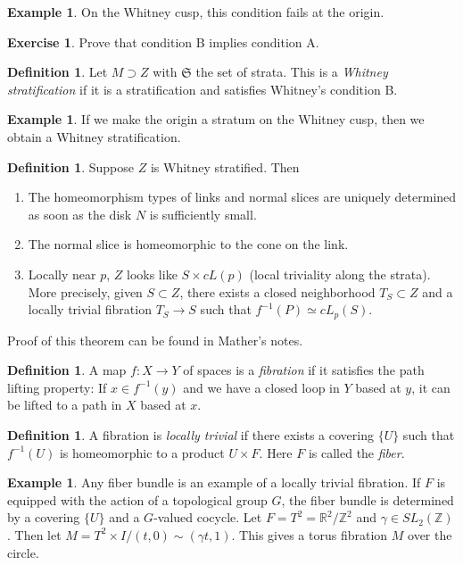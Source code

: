 \documentclass[leqno, openany]{memoir}
\theoremstyle{definition}
\newtheorem{defn}[thm]{Definition}
\newtheorem{exm}[thm]{Example}
\newtheorem{exer}[thm]{Exercise}
\theoremstyle{remark}
\theoremstyle{plain}
\theoremstyle{definition}
\theoremstyle{remark}
\newcommand{\R}{\mathbb{R}}
\newcommand{\Z}{\mathbb{Z}}
\newcommand{\mf}[1]{\mathfrak{#1}}
\begin{document}
\begin{exm} On the Whitney cusp, this condition fails at the origin.  \end{exm}

\begin{exer} Prove that condition B implies condition A.  \end{exer}

\begin{defn} Let $M \supset Z$ with $\mf{S}$ the set of strata. This is a
\textit{Whitney stratification} if it is a stratification and satisfies
Whitney's condition B.  \end{defn}

\begin{exm} If we make the origin a stratum on the Whitney cusp, then we obtain
a Whitney stratification.  \end{exm}

\begin{defn} Suppose $Z$ is Whitney stratified. Then \begin{enumerate} \item
    The homeomorphism types of links and normal slices are uniquely determined
    as soon as the disk $N$ is sufficiently small.  \item The normal slice is
    homeomorphic to the cone on the link.  \item Locally near $p$, $Z$ looks
    like $S \times cL(p)$ (local triviality along the strata). More precisely,
    given $S \subset Z$, there exists a closed neighborhood $T_S \subset Z$ and
    a locally trivial fibration $T_S \to S$ such that $f^{-1}(P) \simeq
    cL_p(S)$.  \end{enumerate} \end{defn} Proof of this theorem can be found in
    Mather's notes.

\begin{defn} A map $f: X \to Y$ of spaces is a \textit{fibration} if it
satisfies the path lifting property: If $x \in f^{-1}(y)$ and we have a closed
loop in $Y$ based at $y$, it can be lifted to a path in $X$ based at $x$.
\end{defn}

\begin{defn} A fibration is \textit{locally trivial} if there exists a covering
$\{U\}$ such that $f^{-1}(U)$ is homeomorphic to a product $U \times F$. Here
$F$ is called the \textit{fiber}.  \end{defn}

\begin{exm} Any fiber bundle is an example of a locally trivial fibration. If
    $F$ is equipped with the action of a topological group $G$, the fiber
    bundle is determined by a covering $\{ U \}$ and a $G$-valued cocycle. Let
    $F = T^2 = \R^2 / \Z^2$ and $\gamma \in SL_2(\Z)$. Then let $M = T^2 \times
    I / (t,0) \sim (\gamma t, 1)$. This gives a torus fibration $M$ over the
    circle.  \end{exm}
\end{document}
